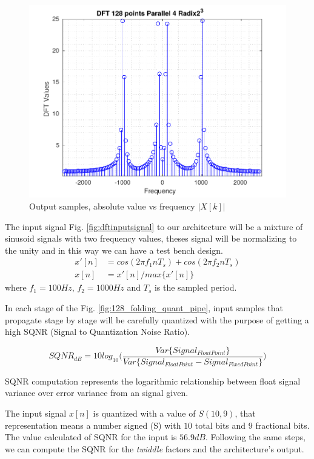 \documentclass[journal,comsoc]{IEEEtran}
\begin{document}
\begin{figure} 
	\centering
	\includegraphics[width=0.95\linewidth]{Diagramas/DftFixedPoint.pdf}
	\caption{Output samples, absolute value vs frequency $|X[k]|$}
	\label{fig:dftfixedpoint}
\end{figure}
The input signal Fig. \ref{fig:dftinputsignal} to our architecture will be a mixture of sinusoid signals with two frequency values, theses signal will be normalizing to the unity and in this way we can have a test bench design.
\begin{align}\label{eq: inputSignal}
x'[n] &= cos(2\pi f_1 n T_s) + cos(2\pi f_2 n T_s)  \\
x[n] &= x'[n]/max\{x'[n]\} 						\nonumber
\end{align}
where $f_1=100Hz$, $f_2=1000Hz$ and $T_s$ is the sampled period.

In each stage of the Fig. \ref{fig:128_folding_quant_pipe}, input samples that propagate stage by stage will be carefully quantized with the purpose of getting a high SQNR (Signal to Quantization Noise Ratio).

\begin{small}
\begin{equation*}%
	SQNR_{dB} = 10log_{10} \bigg(  \frac{  Var\{Signal_{FloatPoint}\}  }{  Var\{Signal_{FloatPoint} - Signal_{FixedPoint}\}}  \bigg)
\end{equation*}
\end{small}
SQNR computation represents the logarithmic relationship between float signal variance over error variance from an signal given.

The input signal $x[n]$ is quantized with a value of $S(10,9)$, that representation means a number signed (S) with $10$ total bits and $9$ fractional bits. The value calculated of SQNR for the input is $56.9dB$. Following the same steps, we can compute the SQNR for the \textit{twiddle} factors and the architecture's output.
\end{document}
